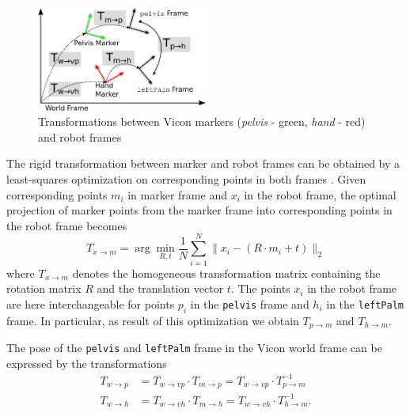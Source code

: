 \begin{figure}
\captionsetup{width=0.52\textwidth}
\centering
\includegraphics[width=0.5\textwidth]{images/vicon_pose/vicon_transforms.pdf}
\caption[Transformations of Vicon markers]{Transformations between Vicon markers (\textit{pelvis} - green, \textit{hand} - red) and robot frames}
\label{fig:transform_vicon_robot}
\end{figure}

The rigid transformation between marker and robot frames can be obtained by a least-squares optimization on corresponding points in both frames \cite{Umeyama1991}. Given corresponding points $m_i$ in marker frame and $x_i$ in the robot frame, the optimal projection of marker points from the marker frame into corresponding points in the robot frame becomes
\begin{equation}
T_{x \rightarrow m} = \arg\min_{R,t} \frac{1}{N} \sum_{i=1}^N \lVert x_i - \left( R \cdot m_i + t \right) \rVert_2
\label{eqn:least_squares_transformation_estimation}
\end{equation}
where $T_{x \rightarrow m}$ denotes the homogeneous transformation matrix containing the rotation matrix $R$ and the translation vector $t$. The points $x_i$ in the robot frame are here interchangeable for points $p_i$ in the \texttt{pelvis} frame and $h_i$ in the \texttt{leftPalm} frame. In particular, as result of this optimization we obtain $T_{p \rightarrow m}$ and $T_{h \rightarrow m}$.

The pose of the \texttt{pelvis} and \texttt{leftPalm} frame in the Vicon world frame can be expressed by the transformations
\begin{align}
T_{w \rightarrow p} &= T_{w \rightarrow vp} \cdot T_{m \rightarrow p} = T_{w \rightarrow vp} \cdot T_{p \rightarrow m}^{-1} \\
T_{w \rightarrow h} &= T_{w \rightarrow vh} \cdot T_{m \rightarrow h} = T_{w \rightarrow vh} \cdot T_{h \rightarrow m}^{-1} .
\end{align}

